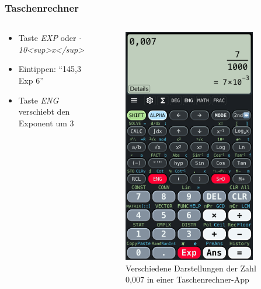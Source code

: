 \begin{frame}
\frametitle{Taschenrechner}
\begin{columns}
    \begin{column}{0.48\textwidth}
    \begin{itemize}
  \item Taste \emph{EXP} oder \emph{$\cdot$10<sup>x</sup>}
  \item Eintippen: \enquote{145,3 Exp 6}
  \item Taste \emph{ENG} verschiebt den Exponent um 3
  \end{itemize}

    \end{column}
   \begin{column}{0.48\textwidth}
       
\begin{figure}
    \includegraphics[width=0.85\textwidth]{foto/172}
    \caption{\scriptsize Verschiedene Darstellungen der Zahl 0,007 in einer Taschenrechner-App}
    \label{e_taschenrechner}
\end{figure}

   \end{column}
\end{columns}

\end{frame}

